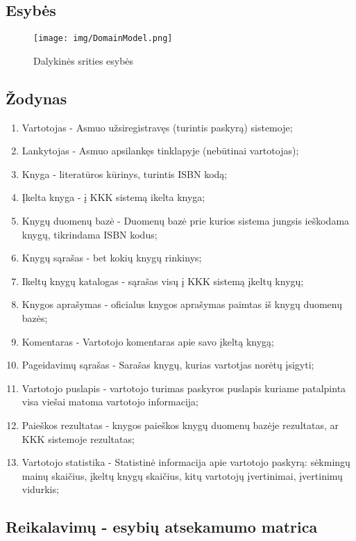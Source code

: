 \documentclass{VUMIFPSkursinis}
\begin{document}
	\subsection{Esybės}
		\begin{figure}[H]
			\centering
			\texttt{[image: img/DomainModel.png]}
			\caption{Dalykinės srities esybės}
			\label{img:psi2}
		\end{figure}

	\subsection{Žodynas}
		\begin{enumerate}[label=\textbf{E\arabic*.}]
			\item Vartotojas - Asmuo užsiregistravęs (turintis paskyrą) sistemoje;
			\item Lankytojas - Asmuo apsilankęs tinklapyje (nebūtinai vartotojas);
			\item Knyga - literatūros kūrinys, turintis ISBN kodą;
			\item Įkelta knyga - į KKK sistemą ikelta knyga;
			\item Knygų duomenų bazė - Duomenų bazė prie kurios sistema jungsis ieškodama knygų, tikrindama ISBN kodus;
			\item Knygų sąrašas - bet kokių knygų rinkinys;
			\item Ikeltų knygų katalogas - sąrašas visų į KKK sistemą įkeltų knygų;
			\item Knygos aprašymas - oficialus knygos aprašymas paimtas iš knygų duomenų bazės;
			\item Komentaras - Vartotojo komentaras apie savo įkeltą knygą;
			\item Pageidavimų sąrašas - Sarašas knygų, kurias vartotjas norėtų įsigyti;
			\item Vartotojo puslapis - vartotojo turimas paskyros puslapis kuriame patalpinta visa viešai matoma vartotojo informacija;
			\item Paieškos rezultatas - knygos paieškos knygų duomenų bazėje rezultatas, ar KKK sistemoje rezultatas;
			\item Vartotojo statistika - Statistinė informacija apie vartotojo paskyrą: sėkmingų mainų skaičius, įkeltų knygų skaičius,
				kitų vartotojų įvertinimai, įvertinimų vidurkis;
		\end{enumerate}

	\subsection{Reikalavimų - esybių atsekamumo matrica}
\end{document}
